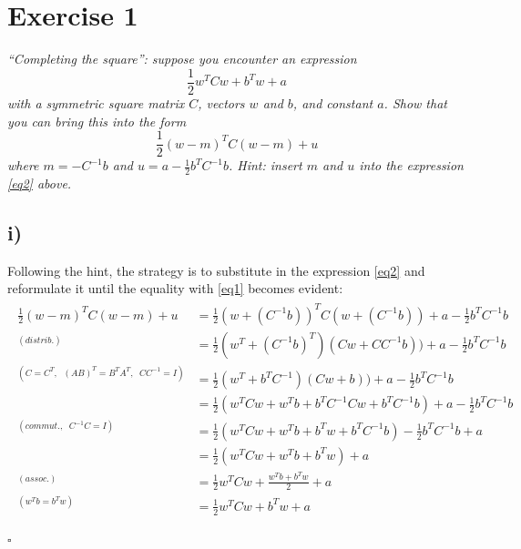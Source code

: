 \documentclass[11pt]{scrartcl} %
\begin{document}
\section*{\\[3mm]Exercise 1}
         {\it ``Completing the square'': suppose you encounter an expression
           \begin{equation}
             \frac{1}{2}w^TCw+b^Tw+a \label{eq1}
           \end{equation}
           with a symmetric square matrix \(C\), vectors \(w\) and \(b\), and constant \(a\). Show that you can bring this into the form
           \begin{equation} \label{eq2}
             \frac{1}{2}(w-m)^TC(w-m)+u
           \end{equation}
           where \(m=-C^{-1}b\) and \(u=a-\frac{1}{2}b^TC^{-1}b\). Hint: insert \(m\) and \(u\) into the expression \ref{eq2} above.}
  

         \subsection*{i)}
         Following the hint, the strategy is to substitute in the expression \ref{eq2} and reformulate it until the equality with \ref{eq1} becomes evident:
         \begin{align*}
           \begin{aligned}
             \frac{1}{2}(w-m)^TC(w-m)+u &= \frac{1}{2}(w+(C^{-1}b))^TC(w+(C^{-1}b))+a-\frac{1}{2}b^TC^{-1}b\\
             ^{(distrib.)}&= \frac{1}{2}(w^T+(C^{-1}b)^T)(Cw+CC^{-1}b))+a-\frac{1}{2}b^TC^{-1}b\\
             ^{(C=C^T,\;\; (AB)^T=B^TA^T,\;\;CC^{-1}=I)}&= \frac{1}{2}(w^T+b^TC^{-1})(Cw+b))+a-\frac{1}{2}b^TC^{-1}b\\
             &= \frac{1}{2}(w^TCw+w^Tb+b^TC^{-1}Cw+b^TC^{-1}b)+a-\frac{1}{2}b^TC^{-1}b\\
             ^{(commut.,\;\;C^{-1}C=I)}&= \frac{1}{2}(w^TCw+w^Tb+b^Tw+b^TC^{-1}b)-\frac{1}{2}b^TC^{-1}b+a\\
             &= \frac{1}{2}(w^TCw+w^Tb+b^Tw)+a\\
             ^{(assoc.)}&= \frac{1}{2}w^TCw+\frac{w^Tb+b^Tw}{2}+a\\
             ^{(w^Tb=b^Tw)}&= \frac{1}{2}w^TCw+b^Tw+a\\
           \end{aligned}
         \end{align*}
         \begin{flushright}
           $\square$\\
         \end{flushright}
\end{document}
